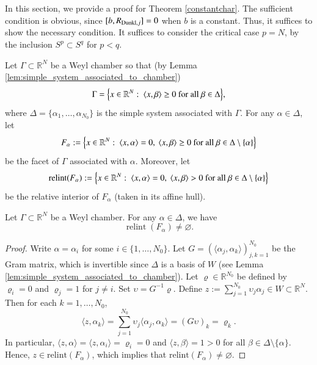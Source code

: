 \documentclass[12pt]{amsart}
\begin{document}
In this section, we provide a proof for Theorem \ref{constantchar}. The sufficient condition is obvious, since $[b,R_{{\rm Dunkl},j}]=0$ when $b$ is a constant. Thus, it suffices to show the necessary condition.
 It suffices to consider  the critical case $p=N$, by the inclusion $ S^p\subset S^{q}$ for $p<q$.

\begin{nota}
Let $\Gamma\subset \mathbb{R}^N$ be a Weyl chamber so that (by Lemma \ref{lem:simple_system_associated_to_chamber})
\begin{align*}
\Gamma=\Bigl\{x\in\mathbb{R}^{N}:\ \langle x,\beta\rangle\ge 0\ \text{for all}\  \beta\in\Delta\Bigr\},
\end{align*}
where $\Delta=\{\alpha_{1},\ldots,\alpha_{N_{0}}\}$ is the simple system associated with $\Gamma$.
For any $\alpha\in\Delta$, let
\[
F_\alpha:=\Bigl\{x\in\mathbb{R}^N:\ \langle x,\alpha\rangle=0,\ \langle x,\beta\rangle\ge 0\ \text{for all}\ \beta\in\Delta\setminus\{\alpha\}\Bigr\}
\]
be the facet of $\Gamma$ associated with $\alpha$.
Moreover, let
\[
\mathrm{relint}(F_\alpha)
:=\Bigl\{x\in\mathbb{R}^N:\ \langle x,\alpha\rangle=0,\ \langle x,\beta\rangle>0\ \text{for all}\ \beta\in\Delta\setminus\{\alpha\}\Bigr\}
\]
be the relative interior of $F_\alpha$ (taken in its affine hull).
\end{nota}

 \begin{lemma}\label{nonempty}
Let $\Gamma\subset \mathbb{R}^N$ be a Weyl chamber. For any $\alpha\in\Delta$, we have
$$\operatorname{relint}(F_\alpha)\neq \varnothing.$$
\end{lemma}
\begin{proof}
Write $\alpha=\alpha_i$ for some $i\in\{1,\dots,N_0\}$.
Let $G=(\langle\alpha_j,\alpha_k\rangle)_{j,k=1}^{N_0}$ be the Gram matrix, which is invertible since $\Delta$ is a basis of $W$ (see Lemma \ref{lem:simple_system_associated_to_chamber}). Let $\varrho\in\mathbb{R}^{N_0}$ be defined by $\varrho_i=0$ and $\varrho_j=1$ for $j\neq i$. Set $\upsilon=G^{-1}\varrho$. Define $z:=\sum_{j=1}^{N_0} \upsilon_j\alpha_j\in W\subset\mathbb{R}^N$.
Then for each $k=1,\dots,N_0$,
\[
\langle z,\alpha_k\rangle=\sum_{j=1}^{N_0}\upsilon_j\langle\alpha_j,\alpha_k\rangle=(G\upsilon)_k=\varrho_k.
\]
In particular, $\langle z,\alpha\rangle=\langle z,\alpha_i\rangle=\varrho_i=0$ and
$\langle z,\beta\rangle=1>0$ for all $\beta\in\Delta\setminus\{\alpha\}$. Hence, $z\in\mathrm{relint}(F_\alpha)$,
which implies that $\mathrm{relint}(F_\alpha)\neq\varnothing$.
\end{proof}
\end{document}

